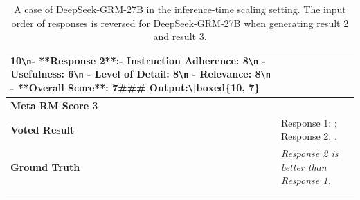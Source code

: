 \documentclass{article} %
\newcommand{\SGRM}{DeepSeek-GRM-27B\xspace}
\begin{document}
\begin{center}
\begin{longtable}{p{2.5cm}|p{10cm}}
10\verb|\n|\newline- **Response 2**:\newline  - Instruction Adherence: 8\verb|\n|  - Usefulness: 6\verb|\n|  - Level of Detail: 8\verb|\n|  - Relevance: 8\verb|\n|  - **Overall Score**: 7\newline\newline\#\#\# Output:\newline\verb|\|boxed\{10, 7\}    \\ \midrule
   \textbf{Meta RM Score 3}   &    {\color{mydarkgreen}{1.6739}}    \\ \midrule
   \textbf{Voted Result}   &     Response 1: {\color{mydarkgreen}{20}}; Response 2: {\color{mydarkgreen}{27}}.     \\ \midrule
   \textbf{Ground Truth}   &    \textit{Response 2 is better than Response 1.}      \\
\bottomrule
\caption{A case of \SGRM in the inference-time scaling setting. The input order of responses is reversed for \SGRM when generating result 2 and result 3.}\label{tab:cases-2}
\end{longtable}
\end{center}
\end{document}
